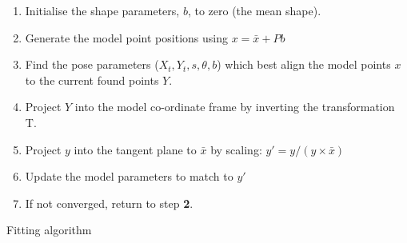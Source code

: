 \begin{algorithm}[h]
  \begin{enumerate}
  \item Initialise the shape parameters, $b$, to zero (the mean shape).
  \item Generate the model point positions using $x = \bar{x} + Pb$
  \item Find the pose parameters ($X_t, Y_t, s, \theta, b$) which best
    align the model points $x$ to the current found points $Y$.
  \item Project $Y$ into the model co-ordinate frame by inverting
    the transformation T.
  \item Project $y$ into the tangent plane to $\bar{x}$ by scaling:
    $y' = y/(y \times \bar{x})$
  \item Update the model parameters to match to $y'$
  \item If not converged, return to step \textbf{2}.
 \end{enumerate}
\caption{Fitting algorithm}
\end{algorithm}